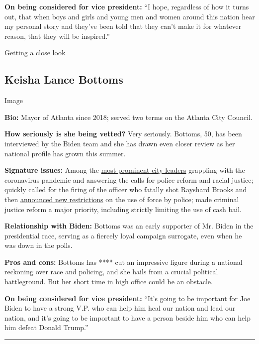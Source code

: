 \textbf{On being considered for vice president:} ``I hope, regardless of
how it turns out, that when boys and girls and young men and women
around this nation hear my personal story and they've been told that
they can't make it for whatever reason, that they will be inspired.''

Getting a close look

\hypertarget{keisha-lance-bottoms}{%
\subsection{Keisha Lance Bottoms}\label{keisha-lance-bottoms}}

Image

\textbf{Bio:} Mayor of Atlanta since 2018; served two terms on the
Atlanta City Council.

\textbf{How seriously is she being vetted?} Very seriously. Bottoms, 50,
has been interviewed by the Biden team and she has drawn even closer
review as her national profile has grown this summer.

\textbf{Signature issues:} Among the
\href{https://www.nytimes3xbfgragh.onion/2020/06/03/opinion/police-protests-atlanta-keisha-bottoms.html}{most
prominent city leaders} grappling with the coronavirus pandemic and
answering the calls for police reform and racial justice; quickly called
for the firing of the officer who fatally shot Rayshard Brooks and then
\href{https://www.nytimes3xbfgragh.onion/2020/06/15/us/rayshard-brooks-keisha-bottoms-atlanta.html}{announced
new restrictions} on the use of force by police; made criminal justice
reform a major priority, including strictly limiting the use of cash
bail.

\textbf{Relationship with Biden:} Bottoms was an early supporter of Mr.
Biden in the presidential race, serving as a fiercely loyal campaign
surrogate, even when he was down in the polls.

\textbf{Pros and cons:} Bottoms has **** cut an impressive figure during
a national reckoning over race and policing, and she hails from a
crucial political battleground. But her short time in high office could
be an obstacle.

\textbf{On being considered for vice president:} ``It's going to be
important for Joe Biden to have a strong V.P. who can help him heal our
nation and lead our nation, and it's going to be important to have a
person beside him who can help him defeat Donald Trump.''

\begin{center}\rule{0.5\linewidth}{\linethickness}\end{center}

